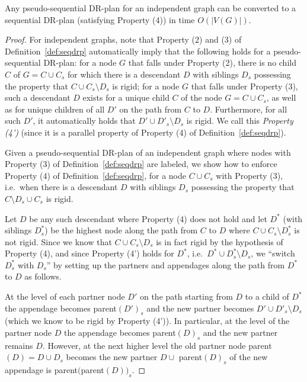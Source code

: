 \begin{lemma}
    Any pseudo-sequential DR-plan for an independent graph can be converted to a sequential DR-plan (satisfying Property (4)) in time $O(|V(G)|)$.
\end{lemma}

\begin{proof}
    For independent graphs, note that Property (2) and (3) of Definition~\ref{def:seqdrp} automatically imply that the following holds for a pseudo-sequential DR-plan: for a node $G$ that falls under Property (2), there is no child $C$ of $G = C\cup C_s$ for which there is a descendant $D$ with siblings $D_s$ possessing the property that $C\cup C_s \setminus D_s$ is rigid; for a node $G$ that falls under Property (3), such a descendant $D$ exists for a unique child $C$ of the node $G=C\cup C_s$, as well as for unique children of all $D'$ on the path from $C$ to $D$. Furthermore, for all such $D'$, it automatically holds that $D'\cup D'_s \setminus D_s$ is rigid. We call this \emph{Property (4')} (since it is a parallel property of Property (4) of Definition~\ref{def:seqdrp}).

    Given a pseudo-sequential DR-plan of an independent graph where nodes with Property (3) of Definition~\ref{def:seqdrp} are labeled, we show how to enforce Property (4) of Definition~\ref{def:seqdrp}, for a node $C\cup C_s$ with Property (3), i.e.\ when there is a descendant $D$ with siblings $D_s$ possessing the property that $C\setminus D_s \cup C_s$ is rigid.

    Let $D$ be any such descendant where Property (4) does not hold and let $D^*$ (with siblings $D^*_s$) be the highest node along the path from $C$ to $D$ where $C\cup C_s \setminus D^*_s$ is not rigid.
    Since we know that $C\cup C_s \setminus D_s$ is in fact rigid by the hypothesis of Property (4), and since Property (4') holds for $D^*$, i.e.\ $D^*\cup D^*_s \setminus D_s$, we ``switch $D^*_s$ with $D_s$'' by setting up the partners and appendages along the path from $D^*$ to $D$ as follows.

    At the level of each partner node $D'$ on the path starting from $D$ to a child of $D^*$ the appendage becomes parent$(D')_s$ and the new partner becomes $D'\cup D'_s\setminus D_s$ (which we know to be rigid by Property (4')). In particular, at the level of the partner node $D$ the appendage becomes parent$(D)_s$ and the new partner remains $D$. However, at the next higher level the old partner node parent$(D) = D\cup D_s$ becomes the new partner $D\cup$ parent$(D)_s$ of the new appendage is parent$($parent$(D))_s$.


\end{proof}
